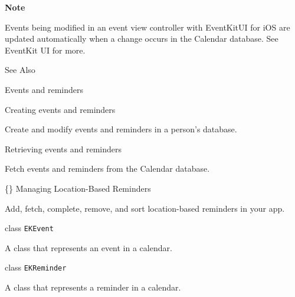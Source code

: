 \documentclass{article}
\begin{document}
\textbf{Note}

Events being modified in an event view controller with EventKitUI for iOS are updated automatically when a change occurs in the Calendar database. See EventKit UI for more.

See Also

Events and reminders

Creating events and reminders

Create and modify events and reminders in a person's database.

Retrieving events and reminders

Fetch events and reminders from the Calendar database.

\{\} Managing Location-Based Reminders

Add, fetch, complete, remove, and sort location-based reminders in your app.

class \texttt{EKEvent}

A class that represents an event in a calendar.

class \texttt{EKReminder}

A class that represents a reminder in a calendar.

\newpage
\end{document}
